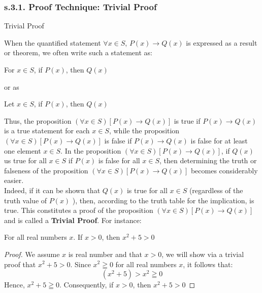 \subsubsection*{s.3.1. Proof Technique: Trivial Proof}
\begin{definition}
Trivial Proof

When the quantified statement $\forall x \in S$, $P(x) \to Q(x)$ is expressed as a result or theorem, we often write such a statement as: 
	\begin{center}
		For $x \in S$, if $P(x)$, then $Q(x)$ 
	\end{center}
or as 
	\begin{center}
		Let $x \in S$, if $P(x)$, then $Q(x)$
	\end{center}
Thus, the proposition $(\forall x \in S)[P(x) \to Q(x)]$ is true if $P(x) \to Q(x)$ is a true statement for  each $x \in S$, while the proposition $(\forall x \in S)[P(x) \to Q(x)]$ is false if $P(x) \to Q(x)$ is false for at least one element $x \in S$. In the proposition $(\forall x \in S)[P(x) \to Q(x)]$, if $Q(x)$ us true for all $x \in S$ if $P(x)$ is false for all $x \in S$, then determining the truth or falseness of the proposition $(\forall x \in S)[P(x) \to Q(x)]$ becomes considerably easier. \\
Indeed, if it can be shown that $Q(x)$ is true for all $x \in S$ (regardless of the truth value of $P(x)$ ), then, according to the truth table for the implication, is true. This constitutes a proof of the proposition $(\forall x \in S)[P(x) \to Q(x)]$ and is called a {\bf Trivial Proof}. For instance: 


\begin{tcolorbox}
	\begin{theorem}
		For all real numbers $x$. If $x>0$, then $x^2 + 5 > 0$
	\end{theorem}
\end{tcolorbox}

\begin{proof}
We assume $x$ is real number and that $x>0$, we will show via a trivial proof that $x^2 + 5 > 0$. Since $x^2 \geqq 0$ for all real numbers $x$, it follows that:
	\begin{equation}
		(x^2 + 5) > x^2 \geqq 0 \nonumber 
	\end{equation}
Hence, $x^2 + 5 \geqq 0$. Consequently, if $x>0$, then $x^2 + 5 > 0$
\end{proof}
\end{definition}





